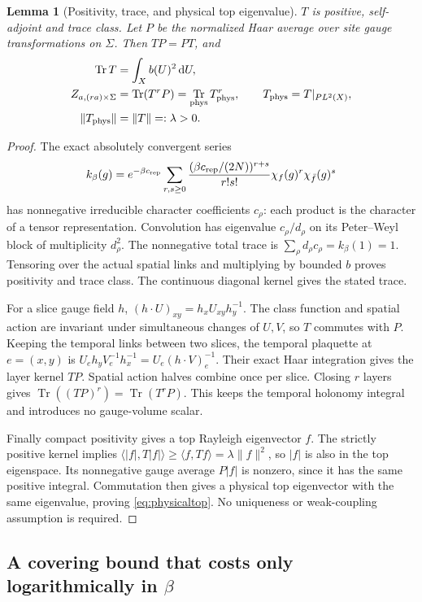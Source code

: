 \documentclass[11pt,letterpaper]{article}
\theoremstyle{plain}
\newtheorem{lemma}[theorem]{Lemma}
\theoremstyle{remark}\newtheorem{remark}[theorem]{Scope}
\DeclareMathOperator{\Tr}{Tr}\DeclareMathOperator{\Vol}{Vol}
\newcommand{\dd}{\,\mathrm d}\newcommand{\OH}{\mathcal O_H}
\begin{document}
\begin{lemma}[Positivity, trace, and physical top eigenvalue]
\label{lem:transfer}
$T$ is positive, self-adjoint and trace class. Let $P$ be the normalized Haar
average over site gauge transformations on $\Sigma$. Then $TP=PT$, and
\begin{align}
\Tr T&=\int_Xb(U)^2\dd U,\notag\\
Z_{a,(ra)\times\Sigma}&=\Tr(T^rP)
=\Tr_{\rm phys}T_{\rm phys}^r,\qquad
T_{\rm phys}=T|_{PL^2(X)},\label{eq:periodictrace}\\
\|T_{\rm phys}\|&=\|T\|=:\lambda>0.
\label{eq:physicaltop}
\end{align}
\end{lemma}
\begin{proof}
The exact absolutely convergent series
\[
k_\beta(g)=e^{-\beta c_{\rm rep}}
\sum_{r,s\ge0}\frac{(\beta c_{\rm rep}/(2N))^{r+s}}{r!s!}
\chi_f(g)^r\chi_{\bar f}(g)^s
\]
has nonnegative irreducible character coefficients $c_\rho$: each product is
the character of a tensor representation. Convolution has eigenvalue
$c_\rho/d_\rho$ on its Peter--Weyl block of multiplicity $d_\rho^2$.
The nonnegative total trace is
$\sum_\rho d_\rho c_\rho=k_\beta(1)=1$.
Tensoring over the actual spatial links and multiplying by bounded $b$ proves
positivity and trace class. The continuous diagonal kernel gives the stated trace.

For a slice gauge field $h$, $(h\cdot U)_{xy}=h_xU_{xy}h_y^{-1}$.
The class function and spatial action are invariant under simultaneous changes
of $U,V$, so $T$ commutes with $P$. Keeping the temporal links between two slices,
the temporal plaquette at $e=(x,y)$ is
$U_eh_yV_e^{-1}h_x^{-1}=U_e(h\cdot V)_e^{-1}$.
Their exact Haar integration gives the layer kernel $TP$. Spatial action halves
combine once per slice. Closing $r$ layers gives $\Tr((TP)^r)=\Tr(T^rP)$.
This keeps the temporal holonomy integral and introduces no gauge-volume scalar.

Finally compact positivity gives a top Rayleigh eigenvector $f$.
The strictly positive kernel implies
$\langle|f|,T|f|\rangle\ge\langle f,Tf\rangle=\lambda\|f\|^2$,
so $|f|$ is also in the top eigenspace. Its nonnegative gauge average $P|f|$
is nonzero, since it has the same positive integral. Commutation then gives a
physical top eigenvector with the same eigenvalue, proving \eqref{eq:physicaltop}.
No uniqueness or weak-coupling assumption is required.
\end{proof}

\subsection{A covering bound that costs only logarithmically in $\beta$}
\end{document}

